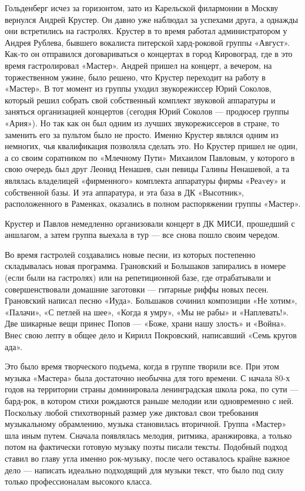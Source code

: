 \documentclass[16pt,a5paper,oneside]{book}
\begin{document}
Гольденберг исчез за горизонтом, зато из Карельской филармонии в Москву вернулся Андрей Крустер. Он давно уже наблюдал
за успехами друга, а однажды они встретились на гастролях. Крустер в то время работал администратором у Андрея Рублева,
бывшего вокалиста питерской хард-роковой группы «Август». Как-то он отправился договариваться о концертах в город
Кировоград, где в это время гастролировал «Мастер». Андрей пришел на концерт, а вечером, на торжественном ужине, было
решено, что Крустер переходит на работу в «Мастер». В тот момент из группы уходил звукорежиссер Юрий Соколов, который
решил собрать свой собственный комплект звуковой аппаратуры и заняться организацией концертов (сегодня Юрий Соколов —
продюсер группы «Ария»). Но так как он был одним из лучших звукорежиссеров в стране, то заменить его за пультом было не
просто. Именно Крустер являлся одним из немногих, чья квалификация позволяла сделать это. Но Крустер пришел не один, а
со своим соратником по «Млечному Пути» Михаилом Павловым, у которого в свою очередь был друг Леонид Ненашев, сын певицы
Галины Ненашевой, а та являлась владелицей «фирменного» комплекта аппаратуры фирмы «Реаvеу» и собственной базы. И эта
аппаратура, и эта база в ДК «Высотник», расположенного в Раменках, оказались в полном распоряжении группы «Мастер».

Крустер и Павлов немедленно организовали концерт в ДК МИСИ, прошедший с аншлагом, а затем группа выехала в тур — все
снова пошло своим чередом.

Во время гастролей создавались новые песни, из которых постепенно складывалась новая программа. Грановский и Большаков
запирались в номере (если были на гастролях) или на репетиционной базе, где отрабатывали и совершенствовали домашние
заготовки — гитарные риффы новых песен. Грановский написал песню «Иуда». Большаков сочинил композиции «Не хотим»,
«Палачи», «С петлей на шее», «Когда я умру», «Мы не рабы» и «Наплевать!». Две шикарные вещи принес Попов — «Боже, храни
нашу злость» и «Война». Внес свою лепту в общее дело и Кирилл Покровский, написавший «Семь кругов ада».

Это было время творческого подъема, когда в группе творили все. При этом музыка «Мастера» была достаточно необычна для
того времени. С начала 80-х годов на территории страны доминировала ленинградская школа рока, по сути — бард-рок, в
котором стихи рождаются раньше мелодии или одновременно с ней. Поскольку любой стихотворный размер уже диктовал свои
требования музыкальному обрамлению, музыка становилась вторичной. Группа «Мастер» шла иным путем. Сначала появлялась
мелодия, ритмика, аранжировка, а только потом на фактически готовую музыку поэты писали тексты. Подобный подход ставил
во главу угла именно рок-музыку, после чего оставалось крайне важное дело — написать идеально подходящий для музыки
текст, что было под силу только профессионалам высокого класса.
\end{document}
